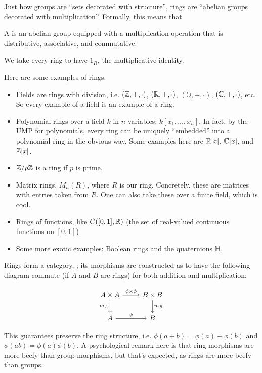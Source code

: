\documentclass[11pt]{article}
\begin{document}
Just how groups are ``sets decorated with structure'', rings
are ``abelian groups decorated with multiplication''. Formally,
this means that
\begin{definition}
    A  is an abelian group equipped with a multiplication
    operation that is distributive, associative, and commutative.
\end{definition}
We take every ring to have $1_R$, the multiplicative
identity.
\begin{eexample}
    Here are some examples of rings:
    \begin{itemize}
        \item Fields are rings with division, i.e. $(\mathbb{Z}, +, \cdot)$,
        $(\mathbb{R}, +, \cdot)$, $(\mathbb{Q}, +, \cdot)$, $(\mathbb{C}, +, \cdot)$,
        etc. So every example of a field is an example of a ring.
        \item Polynomial rings over a field $k$ in $n$ variables: $k[x_1, \ldots, x_n]$.
        In fact, by the UMP for polynomials, every ring can be uniquely ``embedded''
        into a polynomial ring in the obvious way. Some examples here are $\mathbb{R}[x]$,
        $\mathbb{C}[x]$, and $\mathbb{Z}[x]$.
        \item $\mathbb{Z}/p\mathbb{Z}$ is a ring if $p$ is prime.
        \item Matrix rings, $M_n(R)$, where $R$ is our ring. Concretely, these are
        matrices with entries taken from $R$. One can also take these over a finite
        field, which is cool.
        \item Rings of functions, like $C([0, 1], \mathbb{R})$ (the set of real-valued 
        continuous functions on $[0, 1]$)
        \item Some more exotic examples: Boolean rings and the quaternions $\mathbb{H}$.
    \end{itemize}
\end{eexample}

Rings form a category, {}; its morphisms are constructed as
to have the following diagram commute (if $A$ and $B$ are rings) for
both addition and multiplication:

\[
\begin{tikzcd}
A \times A \arrow[r, "\phi \times \phi"] \arrow[d, "m_A"'] & B \times B \arrow[d, "m_B"] \\
A \arrow[r, "\phi"] & B
\end{tikzcd}
\]

This guarantees  preserve the ring
structure, i.e. $\phi(a + b) = \phi(a) + \phi(b)$ and $\phi(ab) = \phi(a)\phi(b)$.
A psychological remark here is that ring morphisms are more
beefy than group morphisms, but that's expected, as rings
are more beefy than groups.
\end{document}

